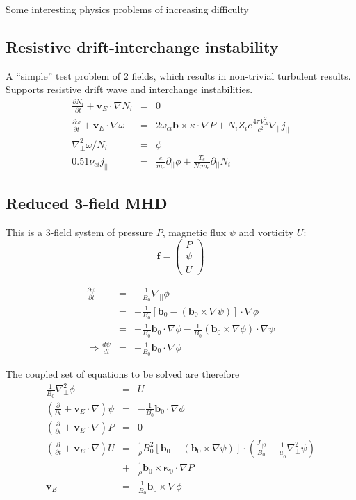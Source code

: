 \documentclass[12pt]{article}
\newcommand{\deriv}[2]{\ensuremath{\frac{\partial #1}{\partial #2}}}
\newcommand{\Vec}[1]{\ensuremath{\mathbf{#1}}}
\newcommand{\bvec}{\Vec{b}}
\newcommand{\kvec}{\Vec{\kappa}}
\newcommand{\vvec}{\Vec{v}}
\newcommand{\bxk}{\bvec_0\times\kvec_0\cdot\nabla}
\newcommand{\delp}{\nabla_\perp^2}
\newcommand{\vE}{\ensuremath{\Vec{v}_E}}
\begin{document}
Some interesting physics problems of increasing difficulty

\subsection{Resistive drift-interchange instability}

A ``simple'' test problem of 2 fields, which results in non-trivial
turbulent results. Supports resistive drift wave and interchange
instabilities.
\begin{eqnarray*}
\deriv{N_i}{t} + \vE\cdot\nabla N_i &=& 0 \\
\deriv{\omega}{t} + \vE\cdot\nabla\omega &=& 2\omega_{ci}\bvec\times\kappa\cdot\nabla P + N_iZ_i e\frac{4\pi V_A^2}{c^2}\nabla_{||}j_{||} \\
\nabla_\perp^2\omega / N_i &=& \phi \\
0.51\nu_{ei}j_{||} &=& \frac{e}{m_e}\partial_{||}\phi + \frac{T_e}{N_i m_e}\partial_{||} N_i
\end{eqnarray*}

\subsection{Reduced 3-field MHD}

This is a 3-field system of pressure $P$, magnetic
flux $\psi$ and vorticity $U$:
\[
\Vec{f} = \left(\begin{array}{c}
P \\
\psi \\
U
\end{array}\right)
\]

\begin{eqnarray*}
  \deriv{\psi}{t} &=& -\frac{1}{B_0}\nabla_{||}\phi \\
  &=& -\frac{1}{B_0}\left[\bvec_0 - \left(\bvec_0\times\nabla\psi\right)\right]\cdot\nabla\phi \\
  &=& -\frac{1}{B_0}\bvec_0\cdot\nabla\phi - \frac{1}{B_0}\left(\bvec_0\times\nabla\phi\right)\cdot\nabla\psi \\
\Rightarrow \frac{d \psi}{dt} &=& -\frac{1}{B_0}\bvec_0\cdot\nabla \phi
\end{eqnarray*}

The coupled set of equations to be solved are therefore
\begin{eqnarray}
\frac{1}{B_0}\delp\phi &=& U \\
\left(\deriv{}{t} + \vvec_E\cdot\nabla\right)\psi &=& -\frac{1}{B_0}\bvec_0\cdot\nabla\phi \\
\left(\deriv{}{t} + \vvec_E\cdot\nabla\right)P &=& 0 \\
\left(\deriv{}{t} + \vvec_E\cdot\nabla\right)U &=& \frac{1}{\rho}B_0^2\left[\bvec_0 - \left(\bvec_0\times\nabla\psi\right)\right]\cdot\left(\frac{J_{||0}}{B_0} - \frac{1}{\mu_0}\delp\psi\right) \nonumber \\
&+& \frac{1}{\rho}\bxk P \\
\vvec_E &=& \frac{1}{B_0}\bvec_0\times\nabla\phi
\end{eqnarray}
\end{document}

